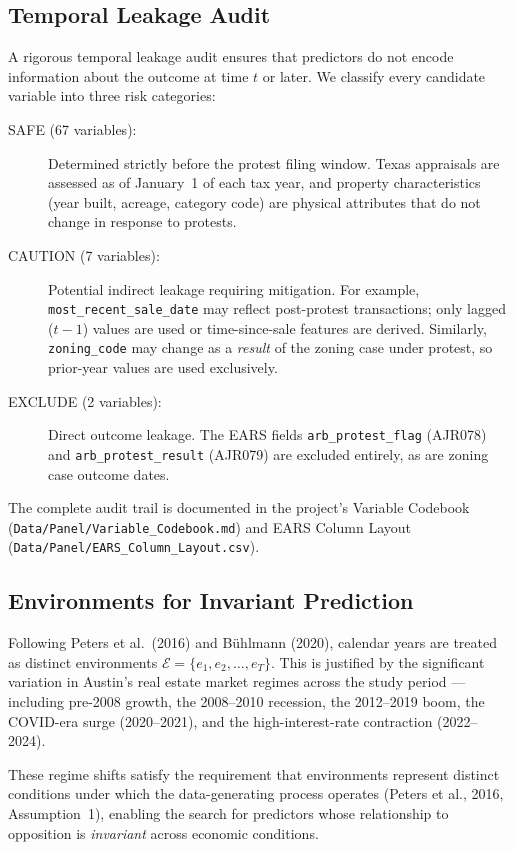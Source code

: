 \subsection{Temporal Leakage Audit}
\label{sec:leakage}

A rigorous temporal leakage audit ensures that predictors do not encode
information about the outcome at time $t$ or later.
We classify every candidate variable into three risk categories:

\begin{description}
    \item[SAFE (67 variables):] Determined strictly before the protest filing window.
    Texas appraisals are assessed as of January~1 of each tax year,
    and property characteristics (year built, acreage, category code) are physical
    attributes that do not change in response to protests.

    \item[CAUTION (7 variables):] Potential indirect leakage requiring mitigation.
    For example, \texttt{most\_recent\_sale\_date} may reflect post-protest transactions;
    only lagged ($t-1$) values are used or time-since-sale features are derived.
    Similarly, \texttt{zoning\_code} may change as a \textit{result} of the zoning case
    under protest, so prior-year values are used exclusively.

    \item[EXCLUDE (2 variables):] Direct outcome leakage.
    The EARS fields \texttt{arb\_protest\_flag} (AJR078) and \texttt{arb\_protest\_result} (AJR079)
    are excluded entirely, as are zoning case outcome dates.
\end{description}

\noindent
The complete audit trail is documented in the project's Variable Codebook
(\texttt{Data/Panel/Variable\_Codebook.md}) and EARS Column Layout
(\texttt{Data/Panel/EARS\_Column\_Layout.csv}).

\subsection{Environments for Invariant Prediction}

Following Peters et al.\ (2016) and Bühlmann (2020), calendar years are treated as
distinct environments $\mathcal{E} = \{e_1, e_2, \ldots, e_T\}$.
This is justified by the significant variation in Austin's real estate market regimes
across the study period --- including pre-2008 growth, the 2008--2010 recession,
the 2012--2019 boom, the COVID-era surge (2020--2021),
and the high-interest-rate contraction (2022--2024).

These regime shifts satisfy the requirement that environments represent
distinct conditions under which the data-generating process operates
(Peters et al., 2016, Assumption~1),
enabling the search for predictors whose relationship to opposition
is \textit{invariant} across economic conditions.
